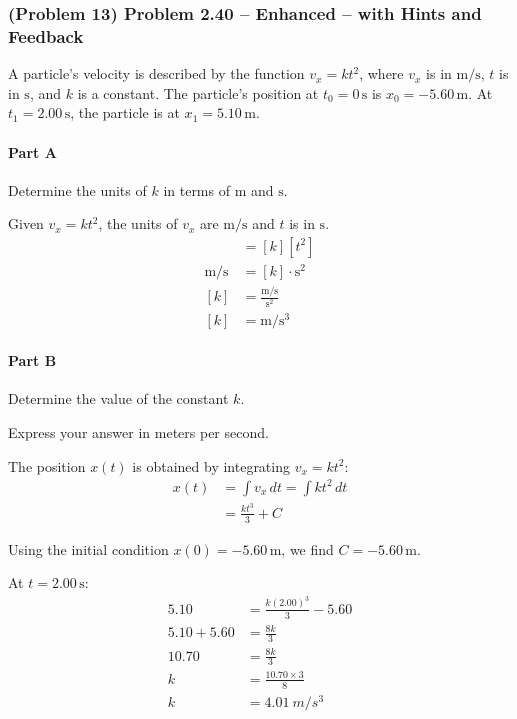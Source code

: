 \newpage

\subsubsection{(Problem 13) Problem 2.40 -- Enhanced -- with Hints and Feedback}

A particle's velocity is described by the function \( v_x = k t^2 \), where \( v_x \) is in \( \mathrm{m/s} \), \( t \) is in \( \mathrm{s} \), and \( k \) is a constant. The particle's position at \( t_0 = 0 \, \mathrm{s} \) is \( x_0 = -5.60 \, \mathrm{m} \). At \( t_1 = 2.00 \, \mathrm{s} \), the particle is at \( x_1 = 5.10 \, \mathrm{m} \).

\paragraph{Part A}
Determine the units of \( k \) in terms of \( \mathrm{m} \) and \( \mathrm{s} \).

\begin{solution}
	Given \( v_x = k t^2 \), the units of \( v_x \) are \( \mathrm{m/s} \) and \( t \) is in \( \mathrm{s} \).
	\begin{align*}
		[v_x] &= [k] [t^2] \\
		\mathrm{m/s} &= [k] \cdot \mathrm{s^2} \\
		[k] &= \frac{\mathrm{m/s}}{\mathrm{s^2}} \\
		[k] &= \mathrm{m/s^3}
	\end{align*}
\end{solution}

\paragraph{Part B}
Determine the value of the constant \( k \).

Express your answer in meters per second.

\begin{solution}
	The position \( x(t) \) is obtained by integrating \( v_x = k t^2 \):
	\begin{align*}
		x(t) &= \int v_x \, dt = \int k t^2 \, dt \\
		&= \frac{k t^3}{3} + C
	\end{align*}

	Using the initial condition \( x(0) = -5.60 \, \mathrm{m} \), we find \( C = -5.60 \, \mathrm{m} \).

	At \( t = 2.00 \, \mathrm{s} \):
	\begin{align*}
		5.10 &= \frac{k (2.00)^3}{3} - 5.60 \\
		5.10 + 5.60 &= \frac{8k}{3} \\
		10.70 &= \frac{8k}{3} \\
		k &= \frac{10.70 \times 3}{8} \\
		k &= \SI{4.01}{m/s^3}
	\end{align*}
\end{solution}

